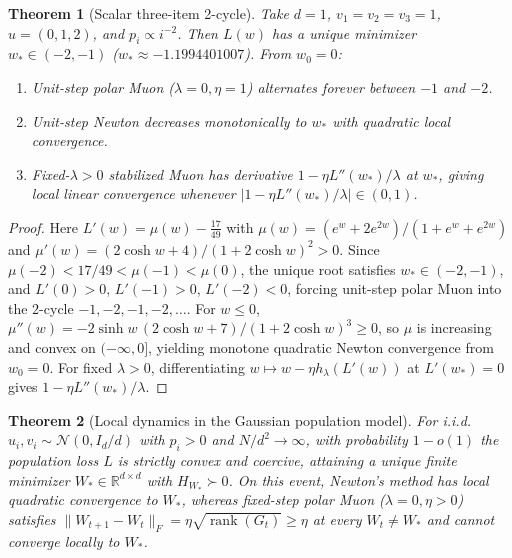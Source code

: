 \documentclass[11pt]{article}
\theoremstyle{plain}
\newtheorem{theorem}{Theorem}
\theoremstyle{definition}
\theoremstyle{remark}
\DeclareMathOperator{\rank}{rank}
\begin{document}
\begin{theorem}[Scalar three-item 2-cycle]\label{thm:scalar}
Take $d = 1$, $v_1 = v_2 = v_3 = 1$, $u = (0, 1, 2)$, and $p_i \propto i^{-2}$.
Then $L(w)$ has a unique minimizer $w_* \in (-2, -1)$ ($w_* \approx -1.1994401007$). From $w_0 = 0$:
\begin{enumerate}[label=\textup{(\arabic*)}]
\item Unit-step polar Muon ($\lambda = 0, \eta = 1$) alternates forever between $-1$ and $-2$.
\item Unit-step Newton decreases monotonically to $w_*$ with quadratic local convergence.
\item Fixed-$\lambda > 0$ stabilized Muon has derivative $1 - \eta L''(w_*)/\lambda$ at $w_*$, giving local linear convergence whenever $|1 - \eta L''(w_*)/\lambda| \in (0, 1)$.
\end{enumerate}
\end{theorem}

\begin{proof}
Here $L'(w) = \mu(w) - \frac{17}{49}$ with $\mu(w) = (e^w + 2e^{2w})/(1 + e^w + e^{2w})$ and $\mu'(w) = (2\cosh w + 4)/(1 + 2\cosh w)^2 > 0$.
Since $\mu(-2) < 17/49 < \mu(-1) < \mu(0)$, the unique root satisfies $w_* \in (-2, -1)$, and $L'(0) > 0$, $L'(-1) > 0$, $L'(-2) < 0$, forcing unit-step polar Muon into the $2$-cycle $-1, -2, -1, -2, \dots$.
For $w \le 0$, $\mu''(w) = -2\sinh w\,(2\cosh w + 7)/(1 + 2\cosh w)^3 \ge 0$, so $\mu$ is increasing and convex on $(-\infty, 0]$, yielding monotone quadratic Newton convergence from $w_0 = 0$.
For fixed $\lambda > 0$, differentiating $w \mapsto w - \eta h_\lambda(L'(w))$ at $L'(w_*) = 0$ gives $1 - \eta L''(w_*)/\lambda$.
\end{proof}

\begin{theorem}[Local dynamics in the Gaussian population model]\label{thm:gaussian-local}
For i.i.d.\ $u_i, v_i \sim \mathcal{N}(0, I_d/d)$ with $p_i > 0$ and $N/d^2 \to \infty$, with probability $1 - o(1)$ the population loss $L$ is strictly convex and coercive, attaining a unique finite minimizer $W_* \in \mathbb{R}^{d \times d}$ with $H_{W_*} \succ 0$.
On this event, Newton's method has local quadratic convergence to $W_*$, whereas fixed-step polar Muon ($\lambda = 0, \eta > 0$) satisfies $\|W_{t+1} - W_t\|_F = \eta\sqrt{\rank(G_t)} \ge \eta$ at every $W_t \neq W_*$ and cannot converge locally to $W_*$.
\end{theorem}
\end{document}
